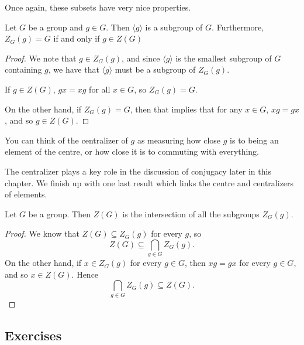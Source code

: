 Once again, these subsets have very nice properties.

\begin{proposition}
  Let $G$ be a group and $g \in G$.  Then $\langle g \rangle$ is a subgroup of
  $G$. Furthermore, $Z_{G}(g) = G$ if and only if $g \in Z(G)$
\end{proposition}
\begin{proof}
  We note that $g \in Z_{G}(g)$, and since $\langle g \rangle$ is the
  smallest subgroup of $G$ containing $g$, we have that $\langle g \rangle$
  must be a subgroup of $Z_{G}(g)$.
  
  If $g \in Z(G)$, $gx = xg$ for all  $x \in G$, so $Z_{G}(g) = G$.
  
  On the other hand, if $Z_{G}(g) = G$, then that implies that for any $x
  \in G$, $xg = gx$, and so $g \in Z(G)$.
\end{proof}

You can think of the centralizer of $g$ as measuring how close $g$ is to
being an element of the centre, or how close it is to commuting with
everything.

The centralizer plays a key role in the discussion of conjugacy later
in this chapter.  We finish up with one last result which links the 
centre and centralizers of elements.

\begin{proposition}
  Let $G$ be a group.  Then $Z(G)$ is the intersection of all the 
  subgroups $Z_{G}(g)$.
\end{proposition}
\begin{proof}
  We know that $Z(G) \subseteq Z_{G}(g)$ for every $g$, so
  \[
    Z(G) \subseteq \bigcap_{g \in G} Z_{G}(g).
  \]
  On the other hand, if $x \in Z_{G}(g)$ for every $g \in G$, then 
  $xg = gx$ for every $g \in G$, and so $x \in Z(G)$.  Hence
  \[
    \bigcap_{g \in G} Z_{G}(g) \subseteq Z(G).
  \]
\end{proof}

\subsection*{Exercises}


